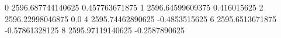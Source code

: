 0 2596.687744140625 0.457763671875
1 2596.64599609375 0.416015625
2 2596.22998046875 0.0
4 2595.74462890625 -0.4853515625
6 2595.6513671875 -0.57861328125
8 2595.97119140625 -0.2587890625
